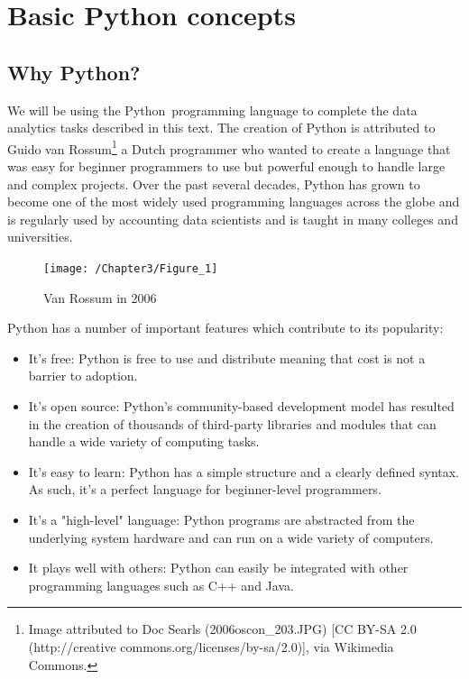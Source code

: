 \documentclass{book}
\begin{document}
\chapter{Basic Python concepts}
\section{Why Python?}
We will be using the Python\texttrademark \ programming language to complete the data analytics tasks described in this text. The creation of Python is attributed to Guido van Rossum\footnote {Image attributed to Doc Searls (2006oscon\_203.JPG) [CC BY-SA 2.0 (http://creative commons.org/licenses/by-sa/2.0)], via Wikimedia Commons.} a Dutch programmer who wanted to create a language that was easy for beginner programmers to use but powerful enough to handle large and complex projects. Over the past several decades, Python has grown to become one of the most widely used programming languages across the globe and is regularly used by accounting data scientists and is taught in many colleges and universities. \begin{figure}[h]
	\caption{Van Rossum in 2006}
	\centering\texttt{[image: /Chapter3/Figure\_1]}
\end{figure}

Python has a number of important features which contribute to its popularity:

\begin{itemize}
	\item It's free: Python is free to use and distribute meaning that cost is not a barrier to adoption.
	\item It's open source: Python's community-based development model has resulted in the creation of thousands of third-party libraries and modules that can handle a wide variety of computing tasks. 
	\item It's easy to learn: Python has a simple structure and a clearly defined syntax. As such, it's a perfect language for beginner-level programmers.
	\item It's a "high-level" language: Python programs are abstracted from the underlying system hardware and can run on a wide variety of computers.
	\item It plays well with others: Python can easily be integrated with other programming languages such as C++ and Java.
\end{itemize}
\end{document}
